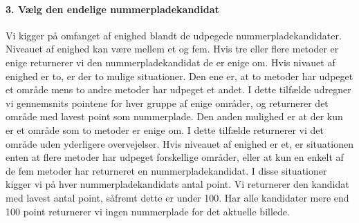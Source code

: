 \paragraph{3. Vælg den endelige nummerpladekandidat}
Vi kigger på omfanget af enighed blandt de udpegede nummerpladekandidater. Niveauet af enighed kan være mellem et og fem. Hvis tre eller flere metoder er enige returnerer vi den nummerpladekandidat de er enige om. Hvis nivauet af enighed er to, er der to mulige situationer. Den ene er, at to metoder har udpeget et område mens to andre metoder har udpeget et andet. I dette tilfælde udregner vi gennemsnits pointene for hver gruppe af enige områder, og returnerer det område med lavest point som nummerplade. Den anden mulighed er at der kun er et område som to metoder er enige om. I dette tilfælde returnerer vi det område uden yderligere overvejelser. Hvis niveauet af enighed er et, er situationen enten at flere metoder har udpeget forskellige områder, eller at kun en enkelt af de fem metoder har returneret en nummerpladekandidat. I disse situationer kigger vi på hver nummerpladekandidats antal point. Vi returnerer den kandidat med lavest antal point, såfremt dette er under 100. Har alle kandidater mere end 100 point returnerer vi ingen nummerplade for det aktuelle billede.

